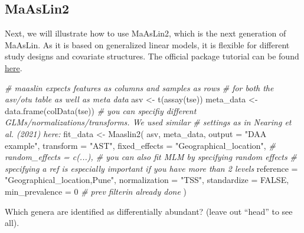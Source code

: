 \documentclass[
]{book}
\newenvironment{Shaded}{\begin{snugshade}}{\end{snugshade}}
\newcommand{\AttributeTok}[1]{\textcolor[rgb]{0.77,0.63,0.00}{#1}}
\newcommand{\CommentTok}[1]{\textcolor[rgb]{0.56,0.35,0.01}{\textit{#1}}}
\newcommand{\ConstantTok}[1]{\textcolor[rgb]{0.00,0.00,0.00}{#1}}
\newcommand{\DecValTok}[1]{\textcolor[rgb]{0.00,0.00,0.81}{#1}}
\newcommand{\FloatTok}[1]{\textcolor[rgb]{0.00,0.00,0.81}{#1}}
\newcommand{\FunctionTok}[1]{\textcolor[rgb]{0.00,0.00,0.00}{#1}}
\newcommand{\NormalTok}[1]{#1}
\newcommand{\OtherTok}[1]{\textcolor[rgb]{0.56,0.35,0.01}{#1}}
\newcommand{\SpecialCharTok}[1]{\textcolor[rgb]{0.00,0.00,0.00}{#1}}
\newcommand{\StringTok}[1]{\textcolor[rgb]{0.31,0.60,0.02}{#1}}
\begin{document}
\hypertarget{maaslin2}{%
\subsection{MaAsLin2}\label{maaslin2}}

Next, we will illustrate how to use MaAsLin2, which is the next generation of
MaAsLin. As it is based on generalized linear models, it is flexible for different study designs and covariate
structures. The official package tutorial can be found \href{https://github.com/biobakery/biobakery/wiki/maaslin2}{here}.

\begin{Shaded}
\begin{Highlighting}[]
\CommentTok{\# maaslin expects features as columns and samples as rows }
\CommentTok{\# for both the asv/otu table as well as meta data }
\NormalTok{asv }\OtherTok{\textless{}{-}} \FunctionTok{t}\NormalTok{(}\FunctionTok{assay}\NormalTok{(tse))}
\NormalTok{meta\_data }\OtherTok{\textless{}{-}} \FunctionTok{data.frame}\NormalTok{(}\FunctionTok{colData}\NormalTok{(tse))}
\CommentTok{\# you can specifiy different GLMs/normalizations/transforms. We used similar}
\CommentTok{\# settings as in Nearing et al. (2021) here:}
\NormalTok{fit\_data }\OtherTok{\textless{}{-}} \FunctionTok{Maaslin2}\NormalTok{(}
\NormalTok{  asv,}
\NormalTok{  meta\_data,}
  \AttributeTok{output =} \StringTok{"DAA example"}\NormalTok{,}
  \AttributeTok{transform =} \StringTok{"AST"}\NormalTok{,}
  \AttributeTok{fixed\_effects =} \StringTok{"Geographical\_location"}\NormalTok{,}
  \CommentTok{\# random\_effects = c(...), \# you can also fit MLM by specifying random effects}
  \CommentTok{\# specifying a ref is especially important if you have more than 2 levels}
  \AttributeTok{reference =} \StringTok{"Geographical\_location,Pune"}\NormalTok{,  }
  \AttributeTok{normalization =} \StringTok{"TSS"}\NormalTok{,}
  \AttributeTok{standardize =} \ConstantTok{FALSE}\NormalTok{,}
  \AttributeTok{min\_prevalence =} \DecValTok{0} \CommentTok{\# prev filterin already done}
\NormalTok{)}
\end{Highlighting}
\end{Shaded}

Which genera are identified as differentially abundant? (leave out ``head'' to see all).

\begin{Shaded}
\end{Shaded}
\end{document}
